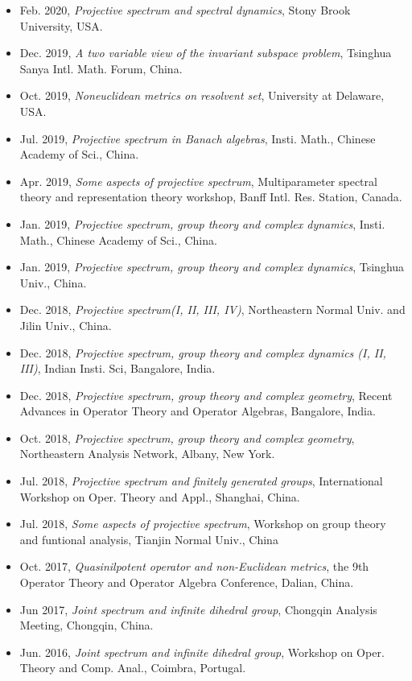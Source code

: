 \documentclass[12pt]{res} %
\begin{document}
\begin{resume}
\begin{itemize}
\item Feb. 2020, {\em Projective spectrum and spectral dynamics}, Stony Brook University, USA.  
\item Dec. 2019, {\em A two variable view of the invariant subspace problem}, Tsinghua Sanya Intl. Math. Forum, China.
\item Oct. 2019, {\em Noneuclidean metrics on resolvent set}, University at Delaware, USA.
\item Jul. 2019,  {\em Projective spectrum in Banach algebras}, Insti. Math., Chinese Academy of Sci., China.
\item Apr. 2019, {\em Some aspects of projective spectrum}, Multiparameter spectral theory and representation theory workshop, Banff Intl. Res. Station, Canada.
\item Jan. 2019, {\em Projective spectrum, group theory and complex dynamics}, Insti. Math., Chinese Academy of Sci., China.
\item Jan. 2019, {\em Projective spectrum, group theory and complex dynamics}, Tsinghua Univ., China.
\item Dec. 2018, {\em Projective spectrum(I, II, III, IV)}, Northeastern Normal Univ. and Jilin Univ., China.
\item Dec. 2018, {\em Projective spectrum, group theory and complex dynamics (I, II, III)}, Indian Insti. Sci, Bangalore, India.
\item Dec. 2018, {\em Projective spectrum, group theory and complex geometry}, Recent Advances in
Operator Theory and Operator Algebras, Bangalore, India.
\item Oct. 2018, {\em Projective spectrum, group theory and complex geometry}, Northeastern Analysis Network, Albany, New York.
\item Jul. 2018, {\em Projective spectrum and finitely generated groups}, International Workshop on Oper. Theory and Appl., Shanghai, China.
\item Jul. 2018, {\em Some aspects of projective spectrum}, Workshop on group theory and funtional analysis, Tianjin Normal Univ., China
\item Oct. 2017, {\em Quasinilpotent operator and non-Euclidean metrics}, the 9th Operator Theory and Operator Algebra Conference, Dalian, China.
\item Jun 2017, {\em Joint spectrum and infinite dihedral group}, Chongqin Analysis Meeting, Chongqin, China.
\item Jun. 2016, {\em Joint spectrum and infinite dihedral group}, Workshop on Oper. Theory and Comp. Anal., Coimbra, Portugal.

\end{itemize}
\end{resume}
\end{document}
